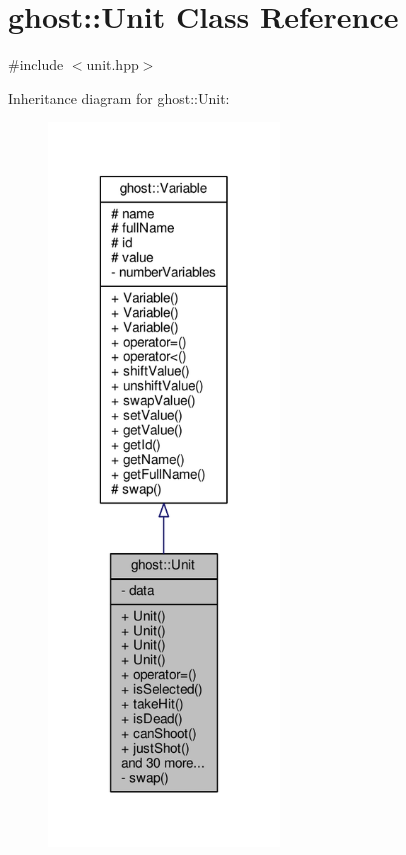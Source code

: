 \hypertarget{classghost_1_1Unit}{\section{ghost\-:\-:Unit Class Reference}
\label{classghost_1_1Unit}
}


{\ttfamily \#include $<$unit.\-hpp$>$}



Inheritance diagram for ghost\-:\-:Unit\-:
\nopagebreak
\begin{figure}[H]
\begin{center}
\leavevmode
\includegraphics[width=174pt]{classghost_1_1Unit__inherit__graph}
\end{center}
\end{figure}


